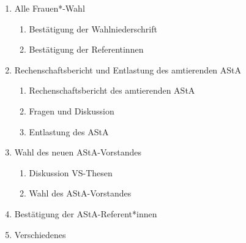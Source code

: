 \documentclass[ngerman,headheight=70pt]{scrartcl}
\begin{document}
\begin{enumerate}[label={\textbf{Top \theenumi}},leftmargin=*]
\begin{enumerate}
            \end{enumerate}
        \item Alle Frauen*-Wahl
            \begin{enumerate}
                \item Bestätigung der Wahlniederschrift
                \item Bestätigung der Referentinnen
            \end{enumerate}
        \item Rechenschaftsbericht und Entlastung des amtierenden AStA
            \begin{enumerate}
                \item Rechenschaftsbericht des amtierenden AStA
                \item Fragen und Diskussion
                \item Entlastung des AStA
              \end{enumerate}
        \item Wahl des neuen AStA-Vorstandes
            \begin{enumerate}
                \item Diskussion VS-Thesen
                \item Wahl des AStA-Vorstandes
            \end{enumerate}
        \item Bestätigung der AStA-Referent*innen
        \item Verschiedenes
    \end{enumerate}
\end{document}
